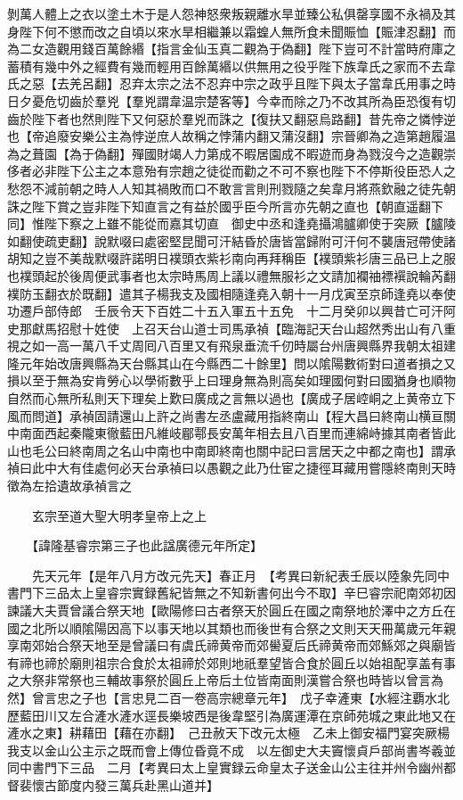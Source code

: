 剝萬人體上之衣以塗土木于是人怨神怒衆叛親離水旱並臻公私俱罄享國不永禍及其身陛下何不懲而改之自頃以來水旱相繼兼以霜蝗人無所食未聞賑恤【賑津忍翻】而為二女造觀用錢百萬餘緡【指言金仙玉真二觀為于偽翻】陛下豈可不計當時府庫之蓄積有幾中外之經費有幾而輕用百餘萬緡以供無用之役乎陛下族韋氏之家而不去韋氏之惡【去羌呂翻】忍弃太宗之法不忍弃中宗之政乎且陛下與太子當韋氏用事之時日夕憂危切齒於羣兇【羣兇謂韋温宗楚客等】今幸而除之乃不改其所為臣恐復有切齒於陛下者也然則陛下又何惡於羣兇而誅之【復扶又翻惡烏路翻】昔先帝之憐悖逆也【帝追廢安樂公主為悖逆庶人故稱之悖蒲内翻又蒲沒翻】宗晉卿為之造第趙履温為之葺園【為于偽翻】殫國財竭人力第成不暇居園成不暇遊而身為戮沒今之造觀崇侈者必非陛下公主之本意殆有宗趙之徒從而勸之不可不察也陛下不停斯役臣恐人之愁怨不減前朝之時人人知其禍敗而口不敢言言則刑戮隨之矣韋月將燕欽融之徒先朝誅之陛下賞之豈非陛下知直言之有益於國乎臣今所言亦先朝之直也【朝直遥翻下同】惟陛下察之上雖不能從而嘉其切直　御史中丞和逢堯攝鴻臚卿使于突厥【臚陵如翻使疏吏翻】說默啜曰處密堅昆聞可汗結昏於唐皆當歸附可汗何不襲唐冠帶使諸胡知之豈不美哉默啜許諾明日襆頭衣紫衫南向再拜稱臣【襆頭紫衫唐三品已上之服也襆頭起於後周便武事者也太宗時馬周上議以禮無服衫之文請加襴䄂褾襈說輪芮翻襆防玉翻衣於既翻】遣其子楊我支及國相隨逢堯入朝十一月戊寅至京師逢堯以奉使功遷戶部侍郎　壬辰令天下百姓二十五入軍五十五免　十二月癸卯以興昔亡可汗阿史那獻馬招慰十姓使　上召天台山道士司馬承禎【臨海記天台山超然秀出山有八重視之如一高一萬八千丈周囘八百里又有飛泉垂流千仞時屬台州唐興縣界我朝太祖建隆元年始改唐興縣為天台縣其山在今縣西二十餘里】問以隂陽數術對曰道者損之又損以至于無為安肯勞心以學術數乎上曰理身無為則高矣如理國何對曰國猶身也順物自然而心無所私則天下理矣上歎曰廣成之言無以過也【廣成子居崆峒之上黄帝立下風而問道】承禎固請還山上許之尚書左丞盧藏用指終南山【程大昌曰終南山横亘關中南面西起秦隴東徹藍田凡維岐郿鄠長安萬年相去且八百里而連綿峙據其南者皆此山也毛公曰終南周之名山中南也中南即終南也關中記曰言居天之中都之南也】謂承禎曰此中大有佳處何必天台承禎曰以愚觀之此乃仕宦之捷徑耳藏用嘗隱終南則天時徵為左拾遺故承禎言之

　　玄宗至道大聖大明孝皇帝上之上

　　【諱隆基睿宗第三子也此諡廣德元年所定】

　　先天元年【是年八月方改元先天】春正月　【考異曰新紀表壬辰以陸象先同中書門下三品太上皇睿宗實録舊紀皆無之不知新書何出今不取】辛巳睿宗祀南郊初因諫議大夫賈曾議合祭天地【歐陽修曰古者祭天於圓丘在國之南祭地於澤中之方丘在國之北所以順隂陽因高下以事天地以其類也而後世有合祭之文則天天冊萬歲元年親享南郊始合祭天地至是曾議曰有虞氏禘黄帝而郊嚳夏后氏禘黄帝而郊鯀郊之與廟皆有禘也禘於廟則祖宗合食於太祖禘於郊則地祇羣望皆合食於圓丘以始祖配享盖有事之大祭非常祭也三輔故事祭於圓丘上帝后土位皆南面則漢嘗合祭也時皆以曾言為然】曾言忠之子也【言忠見二百一卷高宗總章元年】　戊子幸滻東【水經注覇水北歷藍田川又左合滻水滻水逕長樂坡西是後韋堅引為廣運潭在京師苑城之東此地又在滻水之東】耕藉田【藉在亦翻】　己丑赦天下改元太極　乙未上御安福門宴突厥楊我支以金山公主示之既而會上傳位昏竟不成　以左御史大夫竇懷貞戶部尚書岑羲並同中書門下三品　二月【考異曰太上皇實録云命皇太子送金山公主往并州令幽州都督裴懷古節度内發三萬兵赴黑山道并】

